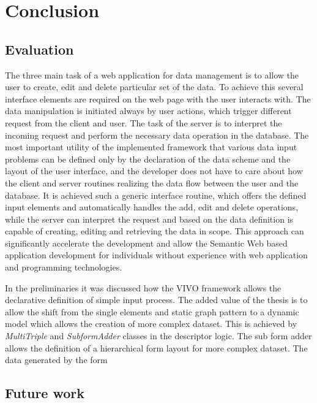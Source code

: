 

\chapter{Conclusion}

\section{Evaluation}

The three main task of a web application for data management is to allow the user to create, edit and delete particular set of the data. To achieve this several interface elements are required on the web page with the user interacts with. The data manipulation is initiated always by user actions, which trigger different request from the client and user. The task of the server is to interpret the incoming request and perform the necessary data operation in the database. The most important utility of the implemented framework that various data input problems can be defined only by the declaration of the data scheme and the layout of the user interface, and the developer does not have to care about how the client and server routines realizing the data flow between the user and the database. It is achieved such a generic interface routine, which offers the defined input elements and automatically handles the add, edit and delete operations, while the server can interpret the request and based on the data definition is capable of creating, editing and retrieving the data in scope. This approach can significantly accelerate the development and allow the Semantic Web based application development for individuals without experience with web application and programming technologies.

In the preliminaries it was discussed how the VIVO framework allows the declarative definition of simple input process. The added value of the thesis is to allow the shift from the single elements and static graph pattern to a dynamic model which allows the creation of more complex dataset. This is achieved by \textit{MultiTriple} and \textit{SubformAdder} classes in the descriptor logic. The sub form adder allows the definition of a hierarchical form layout for more complex dataset. The data generated by the form




\section{Future work}

